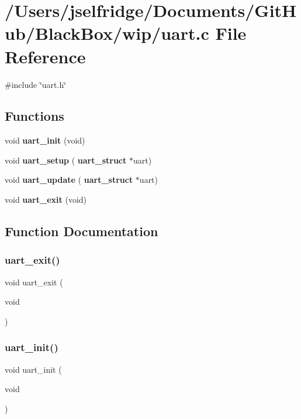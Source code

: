 \section{/\+Users/jselfridge/\+Documents/\+Git\+Hub/\+Black\+Box/wip/uart.c File Reference}
\label{uart_8c}
{\ttfamily \#include \char`\"{}uart.\+h\char`\"{}}\newline
\subsection*{Functions}
\begin{DoxyCompactItemize}
\item 
void \textbf{ uart\+\_\+init} (void)
\item 
void \textbf{ uart\+\_\+setup} (\textbf{ uart\+\_\+struct} $\ast$uart)
\item 
void \textbf{ uart\+\_\+update} (\textbf{ uart\+\_\+struct} $\ast$uart)
\item 
void \textbf{ uart\+\_\+exit} (void)
\end{DoxyCompactItemize}


\subsection{Function Documentation}
\mbox{\label{uart_8c_a7d322e20e7d34d9a8ddea6977e1a338f}} 
\subsubsection{uart\+\_\+exit()}
{\footnotesize\ttfamily void uart\+\_\+exit (\begin{DoxyParamCaption}\item[{void}]{ }\end{DoxyParamCaption})}

\mbox{\label{uart_8c_a0c0ca72359ddf28dcd15900dfba19343}} 
\subsubsection{uart\+\_\+init()}
{\footnotesize\ttfamily void uart\+\_\+init (\begin{DoxyParamCaption}\item[{void}]{ }\end{DoxyParamCaption})}


